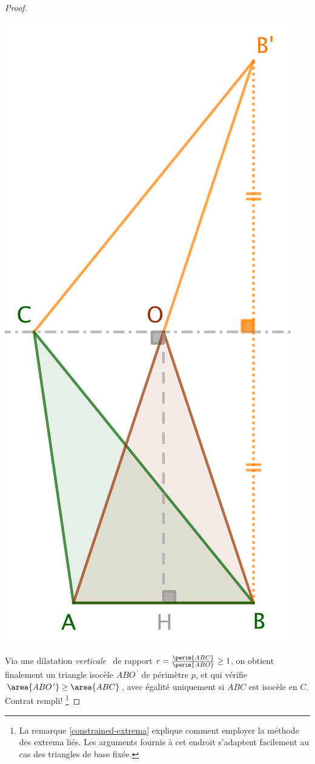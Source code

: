 \begin{proof}
	\begin{center}
		\includegraphics[scale=.4]{content/triangle-one-side-fixed/proof.png}
	\end{center}
	
	Via une dilatation \og \emph{verticale} \fg\ de rapport $r = \frac{\perim{ABC}}{\perim{ABO}} \geq 1$, on obtient finalement un triangle isocèle $ABO^{\,\prime}$ de périmètre $p$, et qui vérifie $\area{ABO^{\,\prime}} \geq \area{ABC}$, avec égalité uniquement si $ABC$ est isocèle en $C$. 
	Contrat rempli!%
	\footnote{
		La remarque \ref{constrained-extrema} explique comment employer la méthode des extrema liés. 
		Les arguments fournis à cet endroit s'adaptent facilement au cas des triangles de base fixée.
	}
\end{proof}

